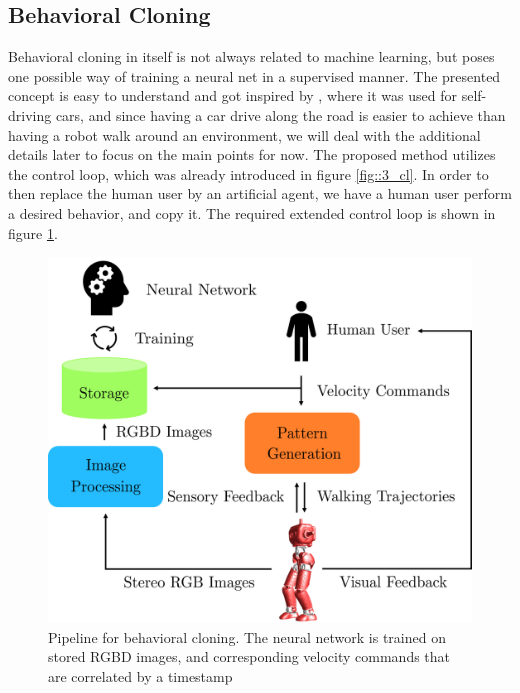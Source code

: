 \subsection{Behavioral Cloning}
\label{sec::322_bc}
Behavioral cloning in itself is not always related to machine learning, but poses one possible way of training a neural net in a supervised manner. The presented concept is easy to understand and got inspired by \cite{bojarski2016end}, where it was used for self-driving cars, and since having a car drive along the road is easier to achieve than having a robot walk around an environment, we will deal with the additional details later to focus on the main points for now. The proposed method utilizes the control loop, which was already introduced in figure \ref{fig::3_cl}. In order to then replace the human user by an artificial agent, we have a human user perform a desired behavior, and copy it. The required extended control loop is shown in figure \ref{fig::322_bc}.
\begin{figure}[h!]
	\centering
	\includegraphics[scale=.5]{chapters/03_background/img/behavioral_cloning.png}
	\caption{Pipeline for behavioral cloning. The neural network is trained on stored RGBD images, and corresponding velocity commands that are correlated by a timestamp}
	\label{fig::322_bc}
\end{figure}
